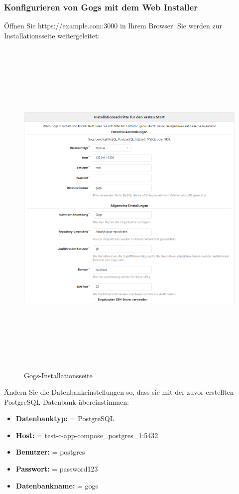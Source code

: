 \documentclass[a4paper,12pt,oneside]{book}
\begin{document}
\subsubsection{Konfigurieren von Gogs mit dem Web Installer}
Öffnen Sie https://example.com:3000 in Ihrem Browser. Sie werden zur Installationsseite weitergeleitet:
\begin{figure}[h!]
	\begin{center}
		\includegraphics[width=15cm, height=17cm]{gogsWebInstaller.PNG}
		\caption{Gogs-Installationsseite} 
		\label{Gogs-Installationsseite} 
	\end{center}
\end{figure}
\newpage
Ändern Sie die Datenbankeinstellungen so, dass sie mit der zuvor erstellten PostgreSQL-Datenbank übereinstimmen:
\begin{itemize}
	\item \textbf{Datenbanktyp: }= PostgreSQL
	\item \textbf{Host: }= test-c-app-compose_postgres_1:5432
	\item \textbf{Benutzer: }= postgres
	\item \textbf{Passwort: }= password123
	\item \textbf{Datenbankname: }= gogs
\end{itemize}
\end{document}
